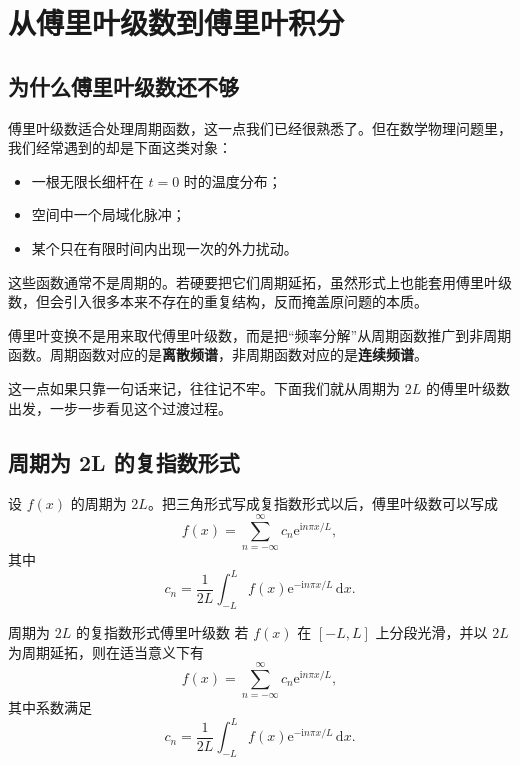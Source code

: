 \section{从傅里叶级数到傅里叶积分}

\subsection{为什么傅里叶级数还不够}

傅里叶级数适合处理周期函数，这一点我们已经很熟悉了。但在数学物理问题里，我们经常遇到的却是下面这类对象：
\begin{itemize}
    \item 一根无限长细杆在 $t=0$ 时的温度分布；
    \item 空间中一个局域化脉冲；
    \item 某个只在有限时间内出现一次的外力扰动。
\end{itemize}

这些函数通常不是周期的。若硬要把它们周期延拓，虽然形式上也能套用傅里叶级数，但会引入很多本来不存在的重复结构，反而掩盖原问题的本质。

\begin{tishi}[本节最重要的观念]
傅里叶变换不是用来取代傅里叶级数，而是把``频率分解''从周期函数推广到非周期函数。周期函数对应的是\textbf{离散频谱}，非周期函数对应的是\textbf{连续频谱}。
\end{tishi}

这一点如果只靠一句话来记，往往记不牢。下面我们就从周期为 $2L$ 的傅里叶级数出发，一步一步看见这个过渡过程。

\subsection{周期为 2L 的复指数形式}

设 $f(x)$ 的周期为 $2L$。把三角形式写成复指数形式以后，傅里叶级数可以写成
\begin{equation}
    f(x)=\sum_{n=-\infty}^{\infty} c_n \mathrm{e}^{\mathrm{i}n\pi x/L},
\end{equation}
其中
\begin{equation}
    c_n=\frac{1}{2L}\int_{-L}^{L} f(x)\mathrm{e}^{-\mathrm{i}n\pi x/L}\,\mathrm{d}x.
\end{equation}

\begin{dingli}{周期为 $2L$ 的复指数形式傅里叶级数}{}
若 $f(x)$ 在 $[-L,L]$ 上分段光滑，并以 $2L$ 为周期延拓，则在适当意义下有
\begin{equation}
    f(x)=\sum_{n=-\infty}^{\infty} c_n \mathrm{e}^{\mathrm{i}n\pi x/L},
\end{equation}
其中系数满足
\begin{equation}
    c_n=\frac{1}{2L}\int_{-L}^{L} f(x)\mathrm{e}^{-\mathrm{i}n\pi x/L}\,\mathrm{d}x.
\end{equation}
\end{dingli}

